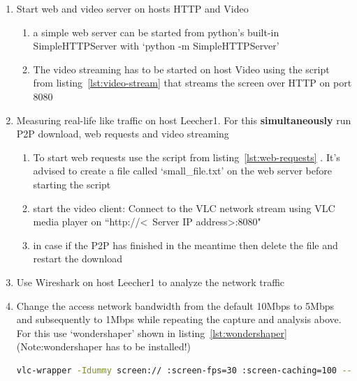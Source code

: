 \documentclass[a4paper]{article}
\begin{document}
\begin{enumerate}
\begin{enumerate}
          \end{enumerate}
    \item Start web and video server on hosts HTTP and Video
          \begin{enumerate}
              \item a simple web server can be started from python's built-in SimpleHTTPServer  with `python -m
                    SimpleHTTPServer'
              \item The video streaming has to be started on host Video using the script from
                    listing~\ref{lst:video-stream} that streams the screen over HTTP on port 8080
          \end{enumerate}
    \item Measuring real-life like traffic on host Leecher1. For this \textbf{simultaneously} run P2P download, web
          requests and video streaming
          \begin{enumerate}
              \item To start web requests use the script from listing~\ref{lst:web-requests} . It's advised to create
                    a file called `small\_file.txt' on the web server before starting the script
              \item start the video client: Connect to the VLC network stream using VLC media player on
                    ``http://\textless~Server IP address\textgreater:8080"
              \item in case if the P2P has finished in the meantime then delete the file and restart the download
          \end{enumerate}
    \item Use Wireshark on host Leecher1 to analyze the network traffic
    \item Change the access network bandwidth from the default 10Mbps to 5Mbps and subsequently to 1Mbps while
          repeating the capture and analysis above. For this use `wondershaper' shown in listing~\ref{lst:wondershaper}
          (Note:wondershaper has to be installed!)

          \begin{lstlisting}[language=bash,frame=single,breaklines,caption={VLC streaming server command},label=lst:video-stream]
vlc-wrapper -Idummy screen:// :screen-fps=30 :screen-caching=100 --sout '#transcode{vcodec=mp4v,vb=4096,acodec=mpga,ab=256,scale=1,width=1280,height=800}:http{port=8080,mux=ts}' 
\end{lstlisting}


\end{enumerate}
\end{document}
